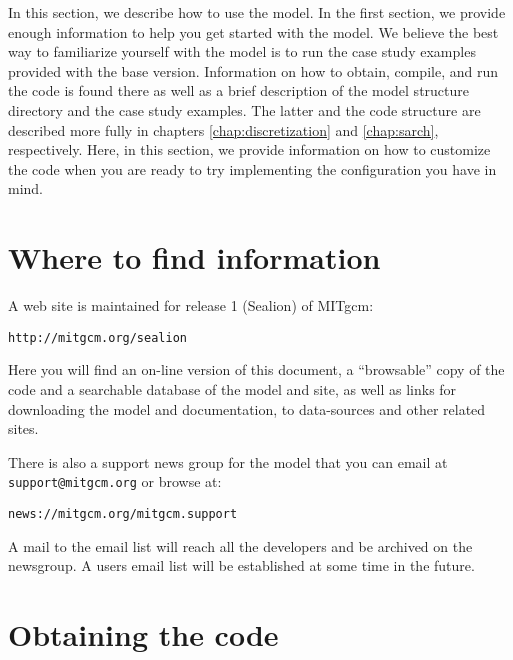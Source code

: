 

In this section, we describe how to use the model. In the first
section, we provide enough information to help you get started with
the model. We believe the best way to familiarize yourself with the
model is to run the case study examples provided with the base
version. Information on how to obtain, compile, and run the code is
found there as well as a brief description of the model structure
directory and the case study examples.  The latter and the code
structure are described more fully in chapters
\ref{chap:discretization} and \ref{chap:sarch}, respectively. Here, in
this section, we provide information on how to customize the code when
you are ready to try implementing the configuration you have in mind.

\section{Where to find information}
\label{sect:whereToFindInfo}

A web site is maintained for release 1 (Sealion) of MITgcm:
\begin{verbatim}
http://mitgcm.org/sealion
\end{verbatim}
Here you will find an on-line version of this document, a
``browsable'' copy of the code and a searchable database of the model
and site, as well as links for downloading the model and
documentation, to data-sources and other related sites.

There is also a support news group for the model that you can email at
\texttt{support@mitgcm.org} or browse at:
\begin{verbatim}
news://mitgcm.org/mitgcm.support
\end{verbatim}
A mail to the email list will reach all the developers and be archived
on the newsgroup. A users email list will be established at some time
in the future.

\section{Obtaining the code}
\label{sect:obtainingCode}

